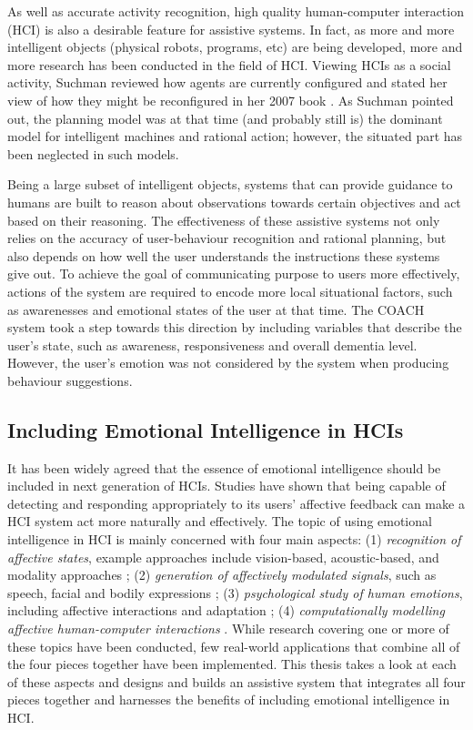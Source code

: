 As well as accurate activity recognition, high quality human-computer interaction (HCI) is also a desirable feature for assistive systems. In fact, as more and more intelligent objects (physical robots, programs, etc) are being developed, more and more research has been conducted in the field of HCI. Viewing HCIs as a social activity, Suchman reviewed how agents are currently configured and stated her view of how they might be reconfigured in her 2007 book \cite{suchman2007human}. As Suchman pointed out, the planning model was at that time (and probably still is) the dominant model for intelligent machines and rational action; however, the situated part has been neglected in such models.

Being a large subset of intelligent objects, systems that can provide guidance to humans are built to reason about observations towards certain objectives and act based on their reasoning. The effectiveness of these assistive systems not only relies on the accuracy of user-behaviour recognition and rational planning, but also depends on how well the user understands the instructions these systems give out. To achieve the goal of communicating purpose to users more effectively, actions of the system are required to encode more local situational factors, such as awarenesses and emotional states of the user at that time. The COACH system \cite{hoey2010automated} took a step towards this direction by including variables that describe the user's state, such as awareness, responsiveness and overall dementia level. However, the user's emotion was not considered by the system when producing behaviour suggestions.

\subsection{Including Emotional Intelligence in HCIs}

It has been widely agreed that the essence of emotional intelligence should be included in next generation of HCIs. Studies have shown that being capable of detecting and responding appropriately to its users' affective feedback can make a HCI system act more naturally and effectively. The topic of using emotional intelligence in HCI is mainly concerned with four main aspects: (1) \textit{recognition of affective states}, example approaches include vision-based, acoustic-based, and modality approaches \cite{pantic2003toward, zeng2009survey}; (2) \textit{generation of affectively modulated signals}, such as speech, facial and bodily expressions \cite{cassell2000embodied, niewiadomski2013computational}; (3) \textit{psychological study of human emotions}, including affective interactions and adaptation \cite{scholl2013socio}; (4) \textit{computationally modelling affective human-computer interactions} \cite{hoey2013bayesian, pynadath2005psychsim, el2000flame, conati2009empirically}. While research covering one or more of these topics have been conducted, few real-world applications that combine all of the four pieces together have been implemented. This thesis takes a look at each of these aspects and designs and builds an assistive system that integrates all four pieces together and harnesses the benefits of including emotional intelligence in HCI.

